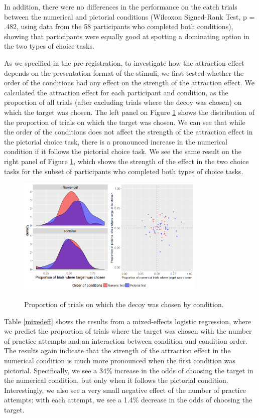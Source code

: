 \documentclass[11pt,a4paper]{article}
\begin{document}
 In addition, there were no differences in the performance on the catch trials between the numerical and pictorial conditions (Wilcoxon Signed-Rank Test, p = .482, using data from the 58 participants who completed both conditions), showing that participants were equally good at spotting a dominating option in the two types of choice tasks.

As we specified in the pre-registration, to investigate how the attraction effect depends on the presentation format of the stimuli, we first tested whether the order of the conditions had any effect on the strength of the attraction effect. We calculated the attraction effect for each participant and condition, as the proportion of all trials (after excluding trials where the decoy was chosen) on which the target was chosen. The left panel on Figure \ref{fig:Teapot_condorder} shows the distribution of the proportion of trials on which the target was chosen. We can see that while the order of the conditions does not affect the strength of the attraction effect in the pictorial choice task, there is a pronounced increase in the numerical condition if it follows the pictorial choice task. We see the same result on the right panel of Figure \ref{fig:Teapot_condorder}, which shows the strength of the effect in the two choice tasks for the subset of participants who completed both types of choice tasks.   

\begin{figure}
\centering
\caption{Proportion of trials on which the decoy was chosen by condition.}
\includegraphics[width=0.8\textwidth]{Teapot_condorder.png}
\label{fig:Teapot_condorder}
\end{figure}




Table \ref{mixedeff} shows the results from a  mixed-effects logistic regression, where we predict the proportion of trials where the target was chosen with the number of practice attempts and an interaction between condition and condition order.  The results again indicate that the strength of the attraction effect in the numerical condition is much more pronounced when the first condition was pictorial. Specifically, we see a 34\% increase in the odds of choosing the target in the numerical condition, but only when it follows the pictorial condition. Interestingly, we also see a very small negative effect of the number of practice attempts: with each attempt, we see a 1.4\% decrease in the odds of choosing the target.
\end{document}
